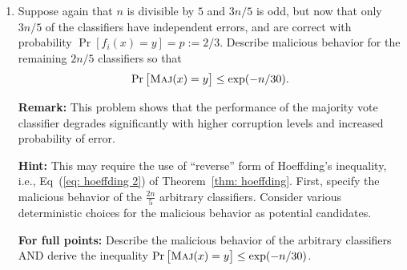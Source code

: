 \begin{enumerate}[font={\Large\bfseries},left=0pt]
\begin{Q}
\begin{enumerate}
       \item
         Suppose again that $n$ is divisible by $5$ and $3n/5$ is odd,
         but now that only $3n/5$ of the classifiers have independent errors,
         and are correct with probability $\Pr[f_i(x) = y] = p:=2/3$.  Describe malicious behavior for the remaining $2n/5$ classifiers so that
         \[
           \Pr\sbr{ \maj(x) = y } \leq \exp(-n / 30).
         \]

\textbf{Remark:} This problem shows that the performance of the majority vote classifier degrades significantly with higher corruption levels and increased probability of error.
  
  \textbf{Hint:} This may require the use of ``reverse'' form of Hoeffding's inequality, i.e., Eq~(\ref{eq: hoeffding 2}) of Theorem~\ref{thm: hoeffding}. First, specify the malicious behavior of the $\frac{2n}{5}$ arbitrary classifiers. Consider various deterministic choices for the malicious behavior as potential candidates.
  
  \textbf{For full points:} Describe the malicious behavior of the arbitrary classifiers AND derive the inequality $\Pr\sbr{ \maj(x) = y } \leq \exp(-n / 30)$.
         
     \end{enumerate}

\end{Q}
  


\end{enumerate}
\clearpage




